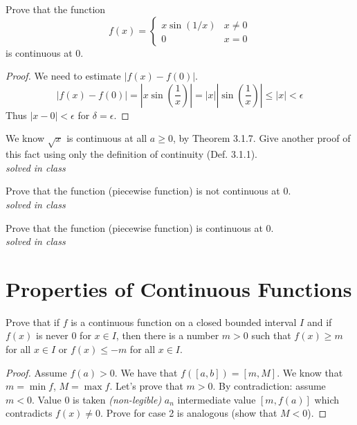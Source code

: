 \documentclass[12pt]{book}
\newenvironment{exercise}[2][Exercise]{\begin{trivlist}
\item[\hskip \labelsep {\bfseries #1}\hskip \labelsep {\bfseries #2.}]}{\end{trivlist}}
\begin{document}
\begin{exercise}{3.1.12}
    Prove that the function
        \[ f(x)= \begin{cases} x \sin(1/x) & x \neq 0 \\ 0 & x=0 \end{cases} \]
    is continuous at 0.
    
    \begin{proof}
    We need to estimate $|f(x)-f(0)|$.
    \[ |f(x)-f(0)| = |x \sin \left(\frac{1}{x} \right)| = |x| |\sin \left( \frac{1}{x} \right)| \leq |x| < \epsilon \]
    Thus $|x-0|<\epsilon$ for $\delta = \epsilon$.
    \end{proof}
\end{exercise}







\begin{exercise}{3.1.8}
We know $\sqrt{x}$ is continuous at all $a \geq 0$, by Theorem 3.1.7. Give another proof of this fact using only the definition of continuity (Def. 3.1.1). \\

\emph{solved in class}
\end{exercise}


\begin{exercise}{3.1.11}
Prove that the function (piecewise function) is not continuous at 0.\\

\emph{solved in class}
\end{exercise}

\begin{exercise}{3.1.12}
Prove that the function (piecewise function) is continuous at 0.\\

\emph{solved in class}
\end{exercise}


\section{Properties of Continuous Functions}

\begin{exercise}{3.2.2}
    Prove that if $f$ is a continuous function on a closed bounded interval $I$ and if $f(x)$ is never 0 for $x \in I$, then there is a number $m>0$ such that $f(x)\geq m$ for all $x \in I$ or $f(x) \leq -m$ for all $x \in I$.
    
    \begin{proof}
    Assume $f(a)>0$. We have that $f([a,b])=[m,M]$. We know that $m=\min f$, $M=\max f$. Let's prove that $m>0$. By contradiction: assume $m<0$. Value 0 is taken \emph{(non-legible)} $a_n$ intermediate value $[m, f(a)]$ which contradicts $f(x)\neq 0$. Prove for case 2 is analogous (show that $M <0$).
    \end{proof}
\end{exercise}
\end{document}

